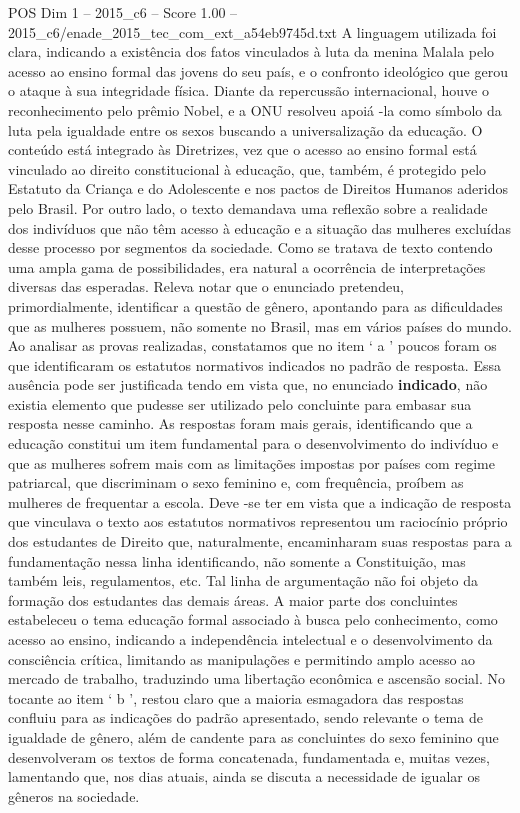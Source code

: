 \begin{textsample}{POS Dim 1 – 2015\_c6 – Score 1.00 – 2015\_c6/enade\_2015\_tec\_com\_ext\_a54eb9745d.txt}
A linguagem utilizada foi clara, indicando a existência dos fatos vinculados à luta da menina Malala pelo acesso ao ensino formal das jovens do seu país, e o confronto ideológico que gerou o ataque à sua integridade física.
Diante da repercussão internacional, houve o reconhecimento pelo prêmio Nobel, e a ONU resolveu apoiá -la como símbolo da luta pela igualdade entre os sexos buscando a universalização da educação.
O conteúdo está integrado às Diretrizes, vez que o acesso ao ensino formal está vinculado ao direito constitucional à educação, que, também, é protegido pelo Estatuto da Criança e do Adolescente e nos pactos de Direitos Humanos aderidos pelo Brasil.
Por outro lado, o texto demandava uma reflexão sobre a realidade dos indivíduos que não têm acesso à educação e a situação das mulheres excluídas desse processo por segmentos da sociedade.
Como se tratava de texto contendo uma ampla gama de possibilidades, era natural a ocorrência de interpretações diversas das esperadas.
Releva notar que o enunciado pretendeu, primordialmente, identificar a questão de gênero, apontando para as dificuldades que as mulheres possuem, não somente no Brasil, mas em vários países do mundo.
Ao analisar as provas realizadas, constatamos que no item ‘ a ’ poucos foram os que identificaram os estatutos normativos indicados no padrão de resposta.
Essa ausência pode ser justificada tendo em vista que, no enunciado \textbf{indicado}, não existia elemento que pudesse ser utilizado pelo concluinte para embasar sua resposta nesse caminho.
As respostas foram mais gerais, identificando que a educação constitui um item fundamental para o desenvolvimento do indivíduo e que as mulheres sofrem mais com as limitações impostas por países com regime patriarcal, que discriminam o sexo feminino e, com frequência, proíbem as mulheres de frequentar a escola.
Deve -se ter em vista que a indicação de resposta que vinculava o texto aos estatutos normativos representou um raciocínio próprio dos estudantes de Direito que, naturalmente, encaminharam suas respostas para a fundamentação nessa linha identificando, não somente a Constituição, mas também leis, regulamentos, etc.
Tal linha de argumentação não foi objeto da formação dos estudantes das demais áreas.
A maior parte dos concluintes estabeleceu o tema educação formal associado à busca pelo conhecimento, como acesso ao ensino, indicando a independência intelectual e o desenvolvimento da consciência crítica, limitando as manipulações e permitindo amplo acesso ao mercado de trabalho, traduzindo uma libertação econômica e ascensão social.
No tocante ao item ‘ b ’, restou claro que a maioria esmagadora das respostas confluiu para as indicações do padrão apresentado, sendo relevante o tema de igualdade de gênero, além de candente para as concluintes do sexo feminino que desenvolveram os textos de forma concatenada, fundamentada e, muitas vezes, lamentando que, nos dias atuais, ainda se discuta a necessidade de igualar os gêneros na sociedade.

\end{textsample}
